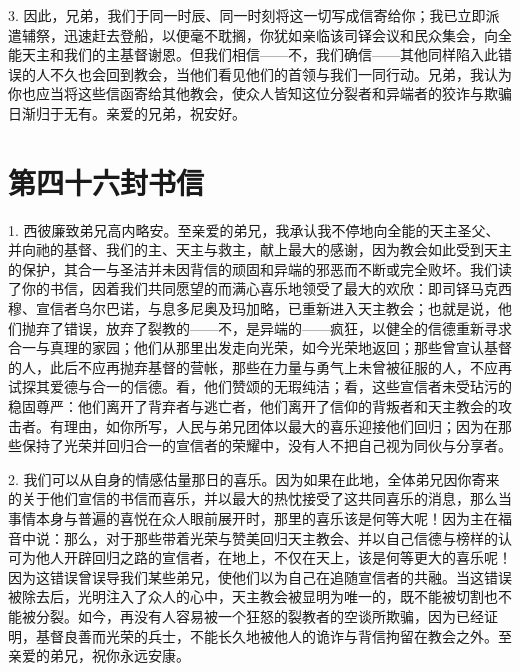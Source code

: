 3. 因此，兄弟，我们于同一时辰、同一时刻将这一切写成信寄给你；我已立即派遣辅祭，迅速赶去登船，以便毫不耽搁，你犹如亲临该司铎会议和民众集会，向全能天主和我们的主基督谢恩。但我们相信——不，我们确信——其他同样陷入此错误的人不久也会回到教会，当他们看见他们的首领与我们一同行动。兄弟，我认为你也应当将这些信函寄给其他教会，使众人皆知这位分裂者和异端者的狡诈与欺骗日渐归于无有。亲爱的兄弟，祝安好。\par



\section{第四十六封书信}

\par

\par

1. 西彼廉致弟兄高内略安。至亲爱的弟兄，我承认我不停地向全能的天主圣父、并向祂的基督、我们的主、天主与救主，献上最大的感谢，因为教会如此受到天主的保护，其合一与圣洁并未因背信的顽固和异端的邪恶而不断或完全败坏。我们读了你的书信，因着我们共同愿望的而满心喜乐地领受了最大的欢欣：即司铎马克西穆、宣信者乌尔巴诺，与息多尼奥及玛加略，已重新进入天主教会；也就是说，他们抛弃了错误，放弃了裂教的——不，是异端的——疯狂，以健全的信德重新寻求合一与真理的家园；他们从那里出发走向光荣，如今光荣地返回；那些曾宣认基督的人，此后不应再抛弃基督的营帐，那些在力量与勇气上未曾被征服的人，不应再试探其爱德与合一的信德。看，他们赞颂的无瑕纯洁；看，这些宣信者未受玷污的稳固尊严：他们离开了背弃者与逃亡者，他们离开了信仰的背叛者和天主教会的攻击者。有理由，如你所写，人民与弟兄团体以最大的喜乐迎接他们回归；因为在那些保持了光荣并回归合一的宣信者的荣耀中，没有人不把自己视为同伙与分享者。\par

2. 我们可以从自身的情感估量那日的喜乐。因为如果在此地，全体弟兄因你寄来的关于他们宣信的书信而喜乐，并以最大的热忱接受了这共同喜乐的消息，那么当事情本身与普遍的喜悦在众人眼前展开时，那里的喜乐该是何等大呢！因为主在福音中说：那么，对于那些带着光荣与赞美回归天主教会、并以自己信德与榜样的认可为他人开辟回归之路的宣信者，在地上，不仅在天上，该是何等更大的喜乐呢！因为这错误曾误导我们某些弟兄，使他们以为自己在追随宣信者的共融。当这错误被除去后，光明注入了众人的心中，天主教会被显明为唯一的，既不能被切割也不能被分裂。如今，再没有人容易被一个狂怒的裂教者的空谈所欺骗，因为已经证明，基督良善而光荣的兵士，不能长久地被他人的诡诈与背信拘留在教会之外。至亲爱的弟兄，祝你永远安康。\par

